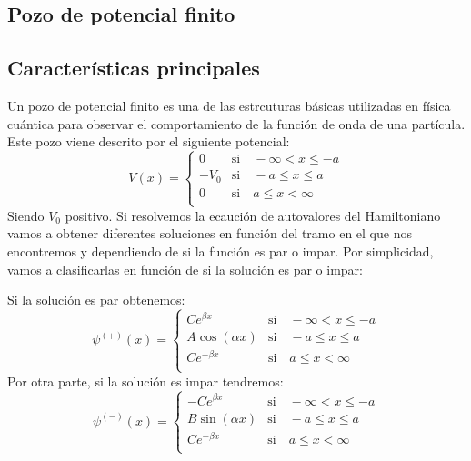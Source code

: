 \documentclass[12pt]{article}
\begin{document}
    \subsection{Pozo de potencial finito}
    \subsection{Características principales}
Un pozo de potencial finito es una de las estrcuturas básicas utilizadas
en física cuántica para observar el comportamiento de la función
de onda de una partícula. Este pozo viene descrito por el siguiente 
potencial:
\begin{equation}
V(x)=\begin{cases} 
    0 & \text{si} \quad -\infty < x \leq -a \\
    -V_0 & \text{si} \quad -a\leq x \leq a \\
    0 & \text{si} \quad a \leq x < \infty \\
 \end{cases}
\end{equation}
Siendo $V_0$ positivo.
Si resolvemos la ecaución de autovalores del Hamiltoniano vamos
a obtener diferentes soluciones en función del tramo en el que 
nos encontremos y dependiendo de si la función es par o impar. Por simplicidad,
vamos a clasificarlas en función de si la solución es par o impar: \\
\par
Si la solución es par obtenemos:
\begin{equation}
    \psi^{(+)}(x)=\begin{cases} 
        C e^{\beta x} & \text{si} \quad -\infty < x \leq -a \\
        A\cos(\alpha x) & \text{si} \quad -a\leq x \leq a \\
        C e^{-\beta x} & \text{si} \quad a \leq x < \infty \\
     \end{cases}
\end{equation}
Por otra parte, si la solución es impar tendremos:
\begin{equation}
    \psi^{(-)}(x)=\begin{cases} 
        -C e^{\beta x} & \text{si} \quad -\infty < x \leq -a \\
        B\sin(\alpha x) & \text{si} \quad -a\leq x \leq a \\
        C e^{-\beta x} & \text{si} \quad a \leq x < \infty \\
     \end{cases}
\end{equation}
\end{document}
